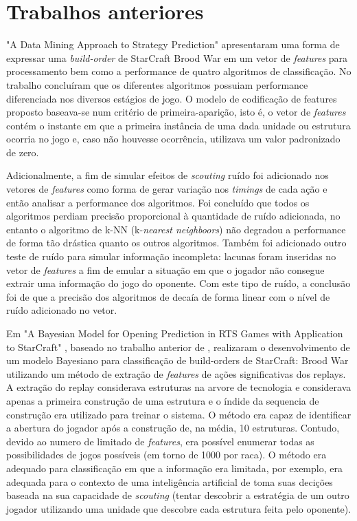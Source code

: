 		\section{Trabalhos anteriores}
"A Data Mining Approach to Strategy Prediction" \cite{weber2009data} apresentaram uma forma de expressar uma \textit{\gls{build-order}} de StarCraft Brood War em um vetor de \textit{features} para processamento bem como a performance de quatro algoritmos de classificação. No trabalho concluíram que os diferentes algoritmos possuiam performance diferenciada nos diversos estágios de jogo. O modelo de codificação de features proposto baseava-se num critério de primeira-aparição, isto é, o vetor de \textit{features} contém o instante em que a primeira instância de uma dada \gls{unidade} ou \gls{estrutura} ocorria no jogo e, caso não houvesse ocorrência, utilizava um valor padronizado de zero.

Adicionalmente, a fim de simular efeitos de \textit{scouting} ruído foi adicionado nos vetores de \textit{features} como forma de gerar variação nos \textit{timings} de cada ação e então analisar a performance dos algoritmos. Foi concluído que todos os algoritmos perdiam precisão proporcional à quantidade de ruído adicionada, no entanto o algoritmo de k-NN (k-\textit{nearest neighboors}) não degradou a performance de forma tão drástica quanto os outros algoritmos. Também foi adicionado outro teste de ruído para simular informação incompleta: lacunas foram inseridas no vetor de \textit{features} a fim de emular a situação em que o jogador não consegue extrair uma informação do jogo do oponente. Com este tipo de ruído, a conclusão foi de que a precisão dos algoritmos de decaía de forma linear com o nível de ruído adicionado no vetor.

Em "A Bayesian Model for Opening Prediction in RTS Games with Application to StarCraft"  \cite{synnaeve2011bayesian1}, baseado no trabalho anterior de \cite{weber2009data}, realizaram o desenvolvimento de um modelo Bayesiano para classificação de \glspl{build-order} de StarCraft: Brood War utilizando um método de extração de \textit{features} de ações significativas dos \glspl{replay}. A extração do \gls{replay} considerava \glspl{estrutura} na arvore de tecnologia e considerava apenas a primeira construção de uma \gls{estrutura} e o índide da sequencia de construção era utilizado para treinar o sistema. O método era capaz de identificar a abertura do jogador após a construção de, na média, 10 \glspl{estrutura}. Contudo, devido ao numero de limitado de \textit{features}, era possível enumerar todas as possibilidades de jogos possíveis (em torno de 1000 por \gls{raca}). O método era adequado para classificação em que a informação era limitada, por exemplo, era adequada para o contexto de uma inteligência artificial de toma suas decições baseada na sua capacidade de \textit{scouting} (tentar descobrir a estratégia de um outro jogador utilizando uma \gls{unidade} que descobre cada \gls{estrutura} feita pelo oponente).


